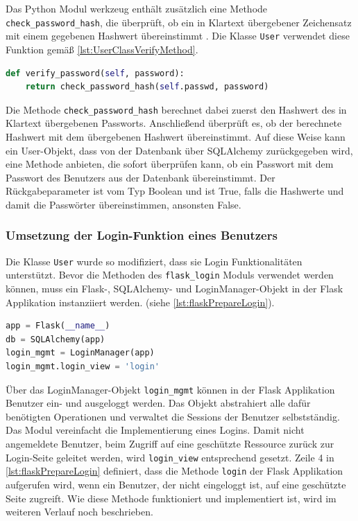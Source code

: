 \documentclass[a4paper,titlepage,halfparskip,12pt]{scrreprt}
\begin{document}
\begin{onehalfspacing}
Das Python Modul werkzeug enthält zusätzlich eine Methode \texttt{check\_password\_hash}, die überprüft, ob ein in Klartext übergebener Zeichensatz mit einem gegebenen Hashwert übereinstimmt \cite{werkzeugDoc}. Die Klasse \texttt{User} verwendet diese Funktion gemäß \autoref{lst:UserClassVerifyMethod}.

\bigskip

\begin{lstlisting}[language=python, caption={Methode zur Überprüfung auf Übereinstimmung eines Zeichensatzes mit einem übergebenen Hashwert}, label={lst:UserClassVerifyMethod}]
def verify_password(self, password):
    return check_password_hash(self.passwd, password)
\end{lstlisting}

Die Methode \texttt{check\_password\_hash} berechnet dabei zuerst den Hashwert des in Klartext übergebenen Passworts. Anschließend überprüft es, ob der berechnete Hashwert mit dem übergebenen Hashwert übereinstimmt. Auf diese Weise kann ein User-Objekt, dass von der Datenbank über SQLAlchemy zurückgegeben wird, eine Methode anbieten, die sofort überprüfen kann, ob ein Passwort mit dem Passwort des Benutzers aus der Datenbank übereinstimmt. Der Rückgabeparameter ist vom Typ Boolean und ist True, falls die Hashwerte und damit die Passwörter übereinstimmen, ansonsten False.

\subsubsection*{Umsetzung der Login-Funktion eines Benutzers}

Die Klasse \texttt{User} wurde so modifiziert, dass sie Login Funktionalitäten unterstützt. Bevor die Methoden des \texttt{flask\_login} Moduls verwendet werden können, muss ein Flask-, SQLAlchemy- und LoginManager-Objekt in der Flask Applikation instanziiert werden. (siehe \autoref{lst:flaskPrepareLogin}).

\begin{lstlisting}[language=python, caption={Vorbereitungen der Login Funktionalität in der Flask Applikation}, label={lst:flaskPrepareLogin}]
app = Flask(__name__)
db = SQLAlchemy(app)
login_mgmt = LoginManager(app)
login_mgmt.login_view = 'login'
\end{lstlisting}

Über das LoginManager-Objekt \texttt{login\_mgmt} können in der Flask Applikation Benutzer ein- und ausgeloggt werden. Das Objekt abstrahiert alle dafür benötigten Operationen und verwaltet die Sessions der Benutzer selbstständig. Das Modul vereinfacht die Implementierung eines Logins. Damit nicht angemeldete Benutzer, beim Zugriff auf eine geschützte Ressource zurück zur Login-Seite geleitet werden, wird \texttt{login\_view} entsprechend gesetzt. Zeile 4 in \autoref{lst:flaskPrepareLogin} definiert, dass die Methode \texttt{login} der Flask Applikation aufgerufen wird, wenn ein Benutzer, der nicht eingeloggt ist, auf eine geschützte Seite zugreift. Wie diese Methode funktioniert und implementiert ist, wird im weiteren Verlauf noch beschrieben.\cite{flaskLogin}


\end{onehalfspacing}
\end{document}
